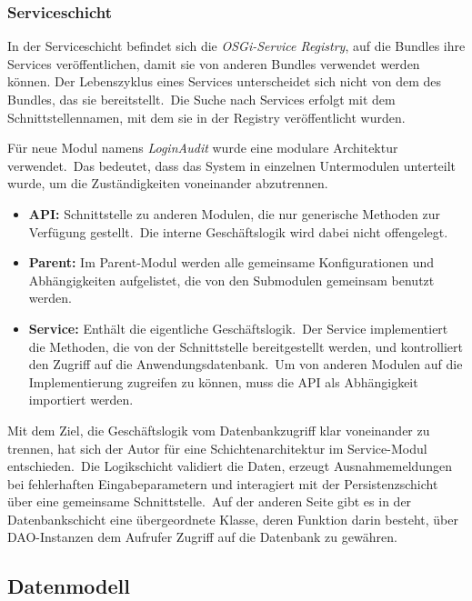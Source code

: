 \subsubsection{Serviceschicht}
\label{subsubsec:Serviceschicht}

In der Serviceschicht befindet sich die \textit{OSGi-Service Registry}, auf die Bundles ihre Services veröffentlichen, damit sie von anderen Bundles verwendet werden können. Der Lebenszyklus
eines Services unterscheidet sich nicht von dem des Bundles, das sie bereitstellt.\ Die Suche nach Services erfolgt mit dem Schnittstellennamen, mit dem sie in der Registry veröffentlicht wurden.

Für neue Modul namens \textit{LoginAudit} wurde eine modulare Architektur verwendet.\ Das bedeutet, dass das System in einzelnen Untermodulen unterteilt wurde, um die Zuständigkeiten voneinander
abzutrennen.

\begin{itemize}
	\item \textbf{API:} Schnittstelle zu anderen Modulen, die nur generische Methoden zur Verfügung gestellt.\ Die interne Geschäftslogik wird dabei nicht offengelegt.
	\item \textbf{Parent:} Im Parent-Modul werden alle gemeinsame Konfigurationen und Abhängigkeiten aufgelistet, die von den Submodulen gemeinsam benutzt werden.
	\item \textbf{Service:} Enthält die eigentliche Geschäftslogik.\ Der Service implementiert die Methoden, die von der Schnittstelle bereitgestellt werden, und kontrolliert den Zugriff auf die Anwendungsdatenbank.\ Um von anderen Modulen auf die Implementierung zugreifen zu können, muss die API als Abhängigkeit importiert werden.
\end{itemize}

Mit dem Ziel, die Geschäftslogik vom Datenbankzugriff klar voneinander zu trennen, hat sich der Autor für eine Schichtenarchitektur im Service-Modul entschieden.\ Die Logikschicht validiert die Daten,
erzeugt Ausnahmemeldungen bei fehlerhaften Eingabeparametern und interagiert mit der Persistenzschicht über eine gemeinsame Schnittstelle.\ Auf der anderen Seite gibt es in der Datenbankschicht eine übergeordnete Klasse,
deren Funktion darin besteht, über DAO-Instanzen dem Aufrufer Zugriff auf die Datenbank zu gewähren.

\subsection{Datenmodell}
\label{subsec:Datenmodell}


